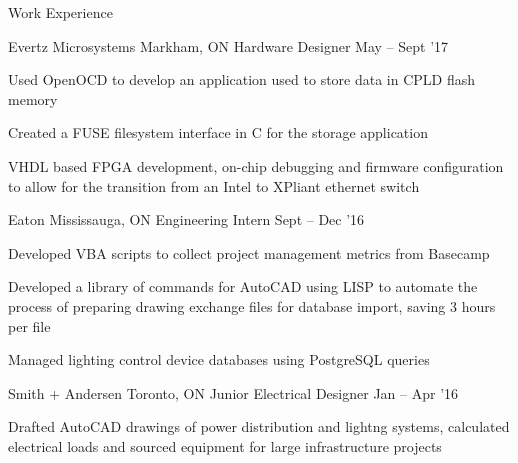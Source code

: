 \documentclass{resume} %
\begin{document}
	\begin{rSection}{Work Experience}
		\begin{rSubsection}{Evertz Microsystems}
			{Markham, ON}
			{Hardware Designer}
			{May -- Sept '17}
			
			\item Used OpenOCD to develop an application used to store data in CPLD flash memory
		 	\item Created a FUSE filesystem interface in C for the storage application
			\item VHDL based FPGA development, on-chip debugging and firmware configuration to allow for the transition from an Intel to XPliant ethernet switch
		\end{rSubsection}
		
		\begin{rSubsection}{Eaton}
			{Mississauga, ON}
			{Engineering Intern}
			{Sept -- Dec '16}
			
			\item Developed VBA scripts to collect project management metrics from Basecamp
			\item Developed a library of commands for AutoCAD using LISP to automate the process of preparing drawing exchange files for database import, saving 3 hours per file
			\item Managed lighting control device databases using PostgreSQL queries
		\end{rSubsection}
		
		\begin{rSubsection}{Smith + Andersen}
			{Toronto, ON}
			{Junior Electrical Designer}
			{Jan -- Apr '16}

			\item Drafted AutoCAD drawings of power distribution and lightng systems, calculated electrical loads and sourced equipment for large infrastructure projects 
		\end{rSubsection}
	\end{rSection}
\end{document}

